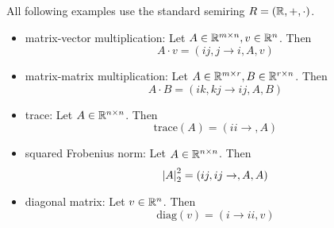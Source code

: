 All following examples use the standard semiring $R = (\mathbb{R}, +, \cdot)$.
\begin{itemize}
    \item matrix-vector multiplication: Let $A \in \mathbb{R}^{m \times n}, v \in \mathbb{R}^{n}$. Then
          $$A \cdot v = (ij, j \rightarrow i, A, v)$$
    \item matrix-matrix multiplication: Let $A \in \mathbb{R}^{m \times r}, B \in \mathbb{R}^{r \times n}$. Then
          $$A \cdot B = (ik, kj \rightarrow ij, A, B)$$
    \item trace: Let $A \in \mathbb{R}^{n \times n}$. Then
          $$\text{trace}(A) = (ii \rightarrow, A)$$
    \item squared Frobenius norm: Let $A \in \mathbb{R}^{n \times n}$. Then
          $$\left\lvert A \right\rvert_2^2 = (ij, ij \rightarrow,A,A)$$
    \item diagonal matrix: Let $v \in \mathbb{R}^{n}$. Then
          $$\text{diag}(v) = (i \rightarrow ii, v)$$
\end{itemize}